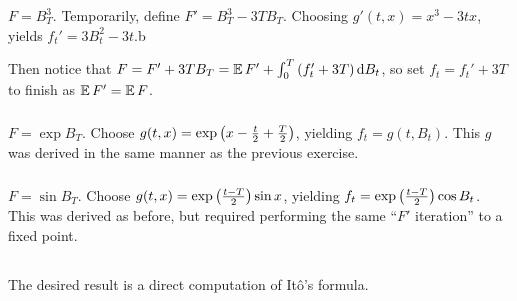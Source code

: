 \documentclass{article}
\begin{document}
        \(F=B_T^3\). Temporarily, define \(F'=B_T^3-3TB_T\). Choosing \(g'(t, x)=x^3-3tx\), yields \(f_t'=3B_t^2-3t\).b

        Then notice that \(F = F'+3TB_T=\operatorname{\mathbb{E}} F' + \int_0^T\left({f_t'+3T}\right)\mathop{\mathrm{d} B_t }\), so set \(f_t=f_t'+3T\) to finish as \(\operatorname{\mathbb{E}} F'=\operatorname{\mathbb{E}} F\).
        
        \subsubsection{}

        \(F=\exp B_T\). Choose \(g(t, x)=\exp\left({x-\frac{t}{2}+\frac{T}{2}}\right)\), yielding \(f_t=g(t, B_t)\). This \(g\) was derived in the same manner as the previous exercise.
        \subsubsection{}

        \(F=\sin B_T\). Choose \(g(t, x)=\exp\left({\frac{t-T}{2}}\right)\sin x\), yielding \(f_t=\exp\left({\frac{t-T}{2}}\right)\cos B_t\). This was derived as before, but required performing the same ``\(F'\) iteration'' to a fixed point.
        
    \subsection{} %

    The desired result is a direct computation of It\^{o}'s formula.
\end{document}
